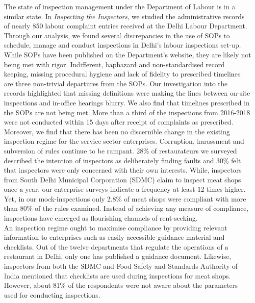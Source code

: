 \documentclass[a4paper, 12pt, twoside]{article}
\begin{document}
The state of inspection management under the Department of Labour is in a similar state. In \textit{Inspecting the Inspectors}, we studied the administrative records of nearly 850 labour complaint entries received at the Delhi Labour Department. Through our analysis, we found several discrepancies in the use of SOPs to schedule, manage and conduct inspections in Delhi’s labour inspections set-up. While SOPs have been published on the Department’s website, they are likely not being met with rigor. Indifferent, haphazard and non-standardised record keeping, missing procedural hygiene and lack of fidelity to prescribed timelines are three non-trivial departures from the SOPs. Our investigation into the records highlighted that missing definitions were making the lines between on-site inspections and in-office hearings blurry. We also find that timelines prescribed in the SOPs are not being met. More than a third of the inspections from 2016-2018 were not conducted within 15 days after receipt of complaints as prescribed. \\

Moreover, we find that there has been no discernible change in the existing inspection regime for the service sector enterprises. Corruption, harassment and subversion of rules continue to be rampant. 28\% of restaurateurs we surveyed described the intention of inspectors as deliberately finding faults and 30\% felt that inspectors were only concerned with their own interests. While, inspectors from South Delhi Municipal Corporation (SDMC) claim to inspect meat shops once a year, our enterprise surveys indicate a frequency at least 12 times higher. Yet, in our mock-inspections only 2.8\% of meat shops were compliant with more than 80\% of the rules examined. Instead of achieving any measure of compliance, inspections have emerged as flourishing channels of rent-seeking. \\

An inspection regime ought to maximise compliance by providing relevant information to enterprises such as easily accessible guidance material and checklists. Out of the twelve departments that regulate the operations of a restaurant in Delhi, only one has published a guidance document. Likewise, inspectors from both the SDMC and Food Safety and Standards Authority of India mentioned that checklists are used during inspections for meat shops. However, about 81\% of the respondents were not aware about the parameters used for conducting inspections. \\
\end{document}
